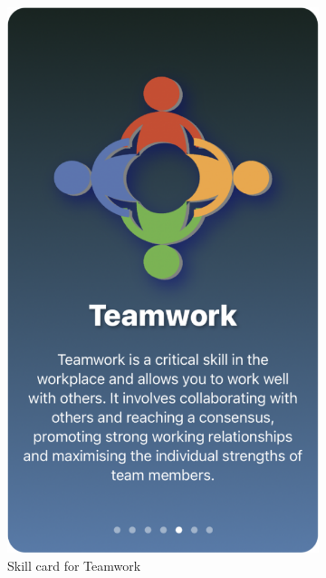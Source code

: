 \documentclass{l4proj}
\begin{document}
\begin{appendices}
\begin{figure}[H]
\begin{subfigure}[b]{0.3\textwidth}
        \includegraphics[scale=0.2]{images/TeamworkCard.pdf}
        \caption{Skill card for Teamwork}
        \label{fig:TeamworkCard}
    \end{subfigure}
    \begin{subfigure}[b]{0.3\textwidth}

\end{subfigure}
\end{figure}
\end{appendices}
\end{document}
